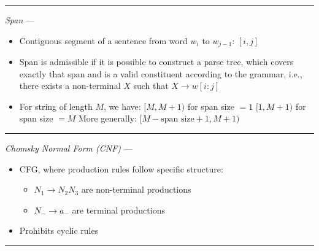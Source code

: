 {\color{lightgray}\hrule height 0.001mm}

\emph{Span} ---
\begin{itemize}
    \item Contiguous segment of a sentence from word $w_i$ to $w_{j-1}$: $[i, j]$
    \item Span is admissible if it is possible to construct a parse tree, which covers exactly that span and is a valid constituent according to the grammar, i.e., there exists a non-terminal $X$ such that $X \to w[i:j]$
    \item For string of length $M$, we have:
    $
    [M, M+1)
    $ for span size $= 1$
    $
    [1, M+1)
    $ for span size $= M$
    More generally:
    $
    [M - \textrm{span size} + 1, M + 1)
    $
\end{itemize}

{\color{lightgray}\hrule height 0.001mm}

\emph{Chomsky Normal Form (CNF)} ---
\begin{itemize}
    \item CFG, where production rules follow specific structure:
    \begin{itemize}
        \item $N_1 \to N_2 N_3$ are non-terminal productions
        \item $N_- \to a_-$ are terminal productions
    \end{itemize}
    \item Prohibits cyclic rules
\end{itemize}

{\color{lightgray}\hrule height 0.001mm}

